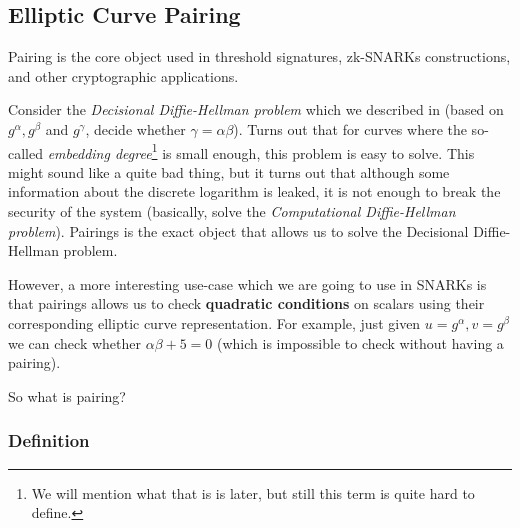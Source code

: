 \documentclass[../lecture-notes.tex]{subfiles}
\begin{document}
\subsection{Elliptic Curve Pairing}\label{section:ecpairing}

Pairing is the core object used in threshold signatures, zk-SNARKs constructions, and other cryptographic applications. 

Consider the \textit{Decisional Diffie-Hellman problem} which we described in  (based on $g^{\alpha},g^{\beta}$ and $g^{\gamma}$, decide whether $\gamma = \alpha\beta$). Turns out that for curves where the so-called \textit{embedding degree}\footnote{We will mention what that is is later, but still this term is quite hard to define.} is small enough, this problem is easy to solve. This might sound 
like a quite bad thing, but it turns out that although some information about the discrete logarithm is leaked, it is not enough to break the security of the system (basically, solve the \textit{Computational Diffie-Hellman problem}). 
Pairings is the exact object that allows us to solve the Decisional Diffie-Hellman problem.

However, a more interesting use-case which we are going to use in SNARKs is that pairings allows us to check \textbf{quadratic conditions} on scalars using their corresponding elliptic curve representation. For example, just given $u=g^{\alpha},v=g^{\beta}$ we can check whether $\alpha\beta+5=0$ (which is impossible to check without having a pairing). 

So what is pairing?

\subsubsection{Definition}
\end{document}
